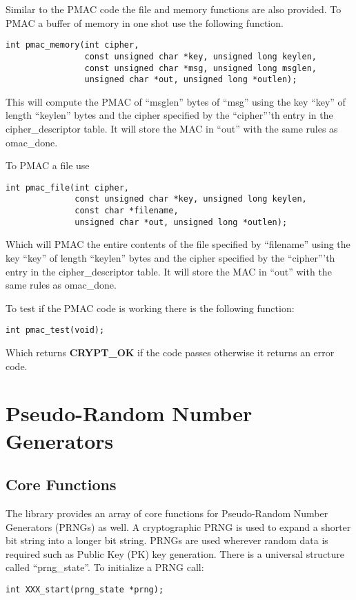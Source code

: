 \documentclass[b5paper]{book}
\begin{document}
Similar to the PMAC code the file and memory functions are also provided.  To PMAC a buffer of memory in one shot use the 
following function.

\begin{verbatim}
int pmac_memory(int cipher, 
                const unsigned char *key, unsigned long keylen,
                const unsigned char *msg, unsigned long msglen,
                unsigned char *out, unsigned long *outlen);
\end{verbatim}
This will compute the PMAC of ``msglen'' bytes of ``msg'' using the key ``key'' of length ``keylen'' bytes and the cipher
specified by the ``cipher'''th entry in the cipher\_descriptor table.  It will store the MAC in ``out'' with the same
rules as omac\_done.

To PMAC a file use
\begin{verbatim}
int pmac_file(int cipher, 
              const unsigned char *key, unsigned long keylen,
              const char *filename, 
              unsigned char *out, unsigned long *outlen);
\end{verbatim}

Which will PMAC the entire contents of the file specified by ``filename'' using the key ``key'' of length ``keylen'' bytes
and the cipher specified by the ``cipher'''th entry in the cipher\_descriptor table.  It will store the MAC in ``out'' with 
the same rules as omac\_done.

To test if the PMAC code is working there is the following function:
\begin{verbatim}
int pmac_test(void);
\end{verbatim}
Which returns {\bf CRYPT\_OK} if the code passes otherwise it returns an error code.


\chapter{Pseudo-Random Number Generators}
\section{Core Functions}

The library provides an array of core functions for Pseudo-Random Number Generators (PRNGs) as well.  A cryptographic PRNG is
used to expand a shorter bit string into a longer bit string.  PRNGs are used wherever random data is required such as Public Key (PK)
key generation.  There is a universal structure called ``prng\_state''.  To initialize a PRNG call:
\begin{verbatim}
int XXX_start(prng_state *prng);
\end{verbatim}
\end{document}
